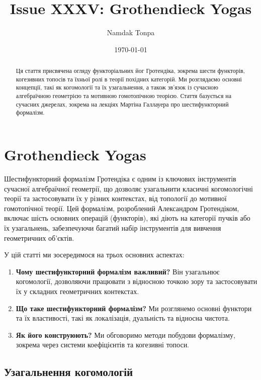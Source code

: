 \documentclass{article}
\theoremstyle{plain}
\theoremstyle{definition}
\begin{document}
\title{Issue XXXV: Grothendieck Yogas}
\author{Namdak Tonpa}
\date{\today}

\maketitle

\begin{abstract}
Ця стаття присвячена огляду функторіальних йог Гротендіка,
зокрема шести функторів, когезивних топосів та їхньої ролі
в теорії похідних категорій. Ми розглядаємо основні концепції,
такі як когомології та їх узагальнення, а також зв’язок із сучасною
алгебраїчною геометрією та мотивною гомотопічною теорією.
Стаття базується на сучасних джерелах, зокрема на лекціях
Мартіна Галлауера про шестифункторний формалізм.
\end{abstract}

\ifincludeTOC
  \tableofcontents
\fi

\section{Grothendieck Yogas}

Шестифункторний формалізм Гротендіка є одним із ключових інструментів сучасної алгебраїчної геометрії, що дозволяє узагальнити класичні когомологічні теорії та застосовувати їх у різних контекстах, від топології до мотивної гомотопічної теорії. Цей формалізм, розроблений Александром Гротендіком, включає шість основних операцій (функторів), які діють на категорії пучків або їх узагальнень, забезпечуючи багатий набір інструментів для вивчення геометричних об’єктів.

У цій статті ми зосередимося на трьох основних аспектах:
\begin{enumerate}
    \item \textbf{Чому шестифункторний формалізм важливий?} Він узагальнює когомології, дозволяючи працювати з відносною точкою зору та застосовувати їх у складних геометричних контекстах.
    \item \textbf{Що таке шестифункторний формалізм?} Ми розглянемо основні функтори та їх властивості, такі як локалізація, дуальність та відносна чистота.
    \item \textbf{Як його конструюють?} Ми обговоримо методи побудови формалізму, зокрема через системи коефіцієнтів та когезивні топоси.
\end{enumerate}

\subsection{Узагальнення когомологій}
\end{document}
